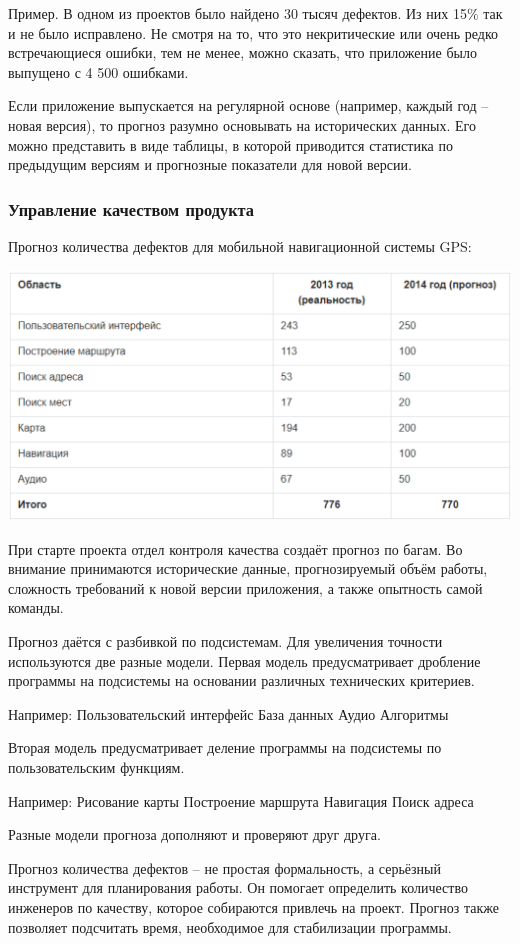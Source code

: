 \documentclass{../industrial-development}
\begin{document}
Пример. В одном из проектов было найдено 30 тысяч дефектов. Из них 15\% так и не было исправлено. Не смотря на то, что это некритические или очень редко встречающиеся ошибки, тем не менее, можно сказать, что приложение было выпущено с 4 500 ошибками.

Если приложение выпускается на регулярной основе (например, каждый год – новая версия), то прогноз разумно основывать на исторических данных. Его можно представить в виде таблицы, в которой приводится статистика по предыдущим версиям и прогнозные показатели для новой версии.

\begin{frame} \frametitle{Управление качеством продукта}
	Прогноз количества дефектов для мобильной навигационной системы GPS:
	\centerline{\includegraphics[width=1\textwidth]{gpstable1.pdf}}
\end{frame}
\lecturenotes
При старте проекта отдел контроля качества создаёт прогноз по багам. Во внимание принимаются исторические данные, прогнозируемый объём работы, сложность требований к новой версии приложения, а также опытность самой команды.

Прогноз даётся с разбивкой по подсистемам. Для увеличения точности используются две разные модели. Первая модель предусматривает дробление программы на подсистемы на основании различных технических критериев.

Например:
Пользовательский интерфейс
База данных
Аудио
Алгоритмы

Вторая модель предусматривает деление программы на подсистемы по пользовательским функциям.

Например:
Рисование карты
Построение маршрута
Навигация
Поиск адреса

Разные модели прогноза дополняют и проверяют друг друга.

Прогноз количества дефектов – не простая формальность, а серьёзный инструмент для планирования работы. Он помогает определить количество инженеров по качеству, которое собираются привлечь на проект. Прогноз также позволяет подсчитать время, необходимое для стабилизации программы.
\end{document}
